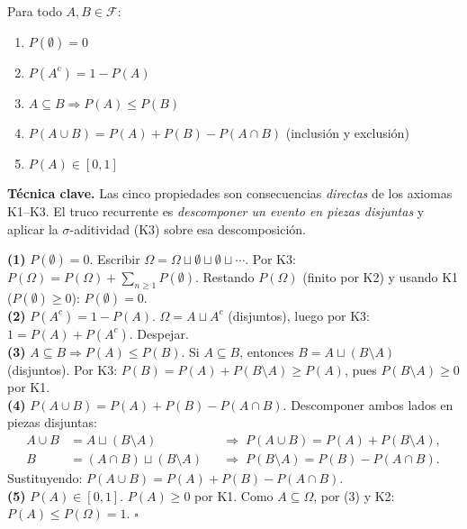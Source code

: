\documentclass[10pt,a4paper]{article}
\numberwithin{equation}{section}
\newcommand{\sigalg}{\mathcal{F}}
\newcounter{thmcount}[section]
\renewcommand{\thethmcount}{\thesection.\arabic{thmcount}}
\newenvironment{proposicion}[1]{%
  \refstepcounter{thmcount}%
  \begin{tcolorbox}[thmbox, title={Proposici\'on \thethmcount\ \textperiodcentered\ #1}]%
}{\end{tcolorbox}}
\newenvironment{nota}{\begin{tcolorbox}[notebox]}{\end{tcolorbox}}
\newenvironment{demostracion}{\begin{tcolorbox}[proofbox]}{\hfill$\square$\end{tcolorbox}}
\begin{document}
\begin{proposicion}{Propiedades b\'asicas}
  Para todo $A, B \in \sigalg$:
  \begin{enumerate}
    \item $P(\emptyset) = 0$
    \item $P(A^c) = 1 - P(A)$
    \item $A \subseteq B \Rightarrow P(A) \leq P(B)$
    \item $P(A \cup B) = P(A) + P(B) - P(A \cap B)$ \quad (inclusi\'on y exclusi\'on)
    \item $P(A) \in [0,1]$
  \end{enumerate}
\end{proposicion}

\begin{nota}
  \textbf{T\'ecnica clave.} Las cinco propiedades son consecuencias \emph{directas} de los
  axiomas K1--K3. El truco recurrente es \emph{descomponer un evento en piezas disjuntas}
  y aplicar la $\sigma$-aditividad (K3) sobre esa descomposici\'on.
\end{nota}

\begin{demostracion}
  \textbf{(1)} $P(\emptyset)=0$. \quad
  Escribir $\Omega = \Omega \sqcup \emptyset \sqcup \emptyset \sqcup \cdots$.
  Por K3: $P(\Omega) = P(\Omega) + \sum_{n\geq 1} P(\emptyset)$.
  Restando $P(\Omega)$ (finito por K2) y usando K1 ($P(\emptyset)\geq 0$): $P(\emptyset) = 0$.
  \\[5pt]
  \textbf{(2)} $P(A^c)=1-P(A)$. \quad
  $\Omega = A \sqcup A^c$ (disjuntos), luego por K3: $1 = P(A)+P(A^c)$. Despejar.
  \\[5pt]
  \textbf{(3)} $A\subseteq B \Rightarrow P(A)\leq P(B)$. \quad
  Si $A\subseteq B$, entonces $B = A \sqcup (B\setminus A)$ (disjuntos). Por K3:
  $P(B) = P(A) + P(B\setminus A) \geq P(A)$, pues $P(B\setminus A)\geq 0$ por K1.
  \\[5pt]
  \textbf{(4)} $P(A\cup B) = P(A)+P(B)-P(A\cap B)$. \quad
  Descomponer ambos lados en piezas disjuntas:
  \begin{align*}
    A\cup B & = A \sqcup (B\setminus A)         &  & \Rightarrow\; P(A\cup B) = P(A)+P(B\setminus A), \\
    B       & = (A\cap B) \sqcup (B\setminus A) &  & \Rightarrow\; P(B\setminus A) = P(B)-P(A\cap B).
  \end{align*}
  Sustituyendo: $P(A\cup B) = P(A) + P(B) - P(A\cap B)$.
  \\[5pt]
  \textbf{(5)} $P(A)\in[0,1]$. \quad
  $P(A)\geq 0$ por K1. Como $A\subseteq\Omega$, por (3) y K2: $P(A)\leq P(\Omega)=1$.
\end{demostracion}
\end{document}
